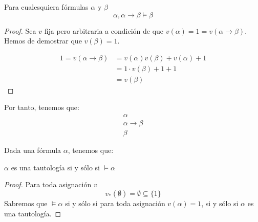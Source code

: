 \begin{ejemplo}
    Para cualesquiera fórmulas $\alpha$ y $\beta$
    \begin{equation*}
        \alpha,\alpha\rightarrow\beta\vDash\beta
    \end{equation*}
\end{ejemplo}
\begin{proof}
    Sea $v$ fija pero arbitraria a condición de que $v(\alpha)=1=v(\alpha\rightarrow\beta)$. Hemos de demostrar que $v(\beta)=1$.

    \begin{align*}
        1=v(\alpha\rightarrow\beta)&=v(\alpha)v(\beta)+v(\alpha)+1 \\
                                 &=1\cdot v(\beta) + 1 + 1 \\
                                 &= v(\beta)
    \end{align*}
\end{proof}
Por tanto, tenemos que:
\begin{equation*}
    \begin{array}{c}
        \alpha\\
        \alpha\rightarrow\beta\\
        \hline
        \beta
    \end{array}
\end{equation*}

\begin{ejercicio}
    Dada una fórmula $\alpha$, tenemos que:
    \begin{center}
        $\alpha$ es una tautología si y sólo si $\vDash\alpha$
    \end{center}
    
    \begin{proof}
        Para toda asignación $v$ 
        \begin{equation*}
            v_*(\emptyset ) = \emptyset \subseteq \{1\}
        \end{equation*}
        Sabremos que $\vDash\alpha$ si y sólo si para toda asignación $v(\alpha)=1$, si y sólo si $\alpha$ es una tautología.
    \end{proof}
    
\end{ejercicio}

